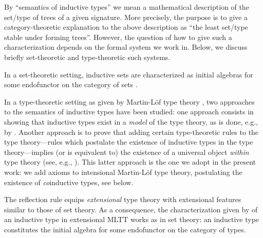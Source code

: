 \documentclass[a4paper,USenglish]{lipics}
\begin{document}
  
 By \enquote{semantics of inductive types} we mean a mathematical description of the set/type of trees of a given signature. 
 More precisely, the purpose is to give a category-theoretic explanation to the above description as \enquote{the least set/type stable under forming trees}.
 However, the question of how to give such a characterization depends on the formal system we work in. 
 Below, we discuss briefly set-theoretic and type-theoretic such systems.
 
 In a set-theoretic setting, inductive sets are characterized as initial algebras for 
 some endofunctor on the category of sets \parencite{jacobs1997tutorial}.
 
 In a type-theoretic setting as given by Martin-L\"of type theory \parencite{martin_lof}, 
 two approaches to the semantics of inductive types have been studied: 
 one approach consists in showing that inductive types exist in a \emph{model} of the type theory,
 as is done, e.g., by \textcite{DBLP:journals/apal/MoerdijkP00}.
 Another approach is to prove that adding certain type-theoretic rules to the type theory---rules which postulate the existence
 of inductive types in the type theory---implies (or is equivalent to) the existence of a universal object \emph{within} type theory
 (see, e.g., \parencite{DBLP:conf/lics/AwodeyGS12, DBLP:journals/tcs/Dybjer97}).
 This latter approach is the one we adopt in the present work: we add axioms to intensional Martin-Löf type theory,
 postulating the existence of \emph{co}inductive types, see below.
 
 
%  
 
 The reflection rule equips \emph{extensional} type theory with extensional features similar to those of set theory.
 As a consequence, the characterization given by \textcite{DBLP:journals/tcs/Dybjer97} of an inductive type in extensional MLTT works as in set theory: 
 an inductive type constitutes the initial algebra for some endofunctor on the category of types.
 
 
  
\end{document}
